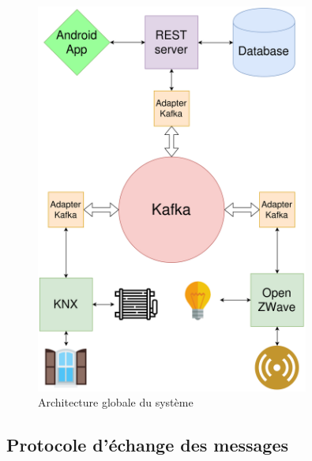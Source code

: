 \begin{figure}
    \begin{center}
        \includegraphics[width=0.8\textwidth]{img/general.png}
    \end{center}
    \caption{Architecture globale du système}
    \label{shema_general}
\end{figure}


\subsection{Protocole d'échange des messages}


